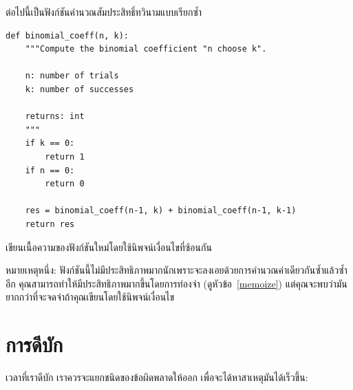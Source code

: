 \begin{exercise}

ต่อไปนี้เป็นฟังก์ชันคำนวณสัมประสิทธิ์ทวินามแบบเรียกซ้ำ

\begin{verbatim}
def binomial_coeff(n, k):
    """Compute the binomial coefficient "n choose k".

    n: number of trials
    k: number of successes

    returns: int
    """
    if k == 0:
        return 1
    if n == 0:
        return 0

    res = binomial_coeff(n-1, k) + binomial_coeff(n-1, k-1)
    return res
\end{verbatim}

เขียนเนื้อความของฟังก์ชันใหม่โดยใช้นิพจน์เงื่อนไขที่ซ้อนกัน

หมายเหตุหนึ่ง: ฟังก์ชันนี้ไม่มีประสิทธิภาพมากนักเพราะจะลงเอยด้วยการคำนวณค่าเดียวกันซ้ำแล้วซ้ำอีก คุณสามารถทำให้มีประสิทธิภาพมากขึ้นโดยการท่องจำ (ดูหัวข้อ~\ref{memoize}) 
แต่คุณจะพบว่ามันยากกว่าที่จะจดจำถ้าคุณเขียนโดยใช้นิพจน์เงื่อนไข
\end{exercise}

\appendix

\chapter{การดีบัก}


เวลาที่เราดีบัก
เราควรจะแยกชนิดของข้อผิดพลาดให้ออก
เพื่อจะได้หาสาเหตุมันได้เร็วขึ้น:


